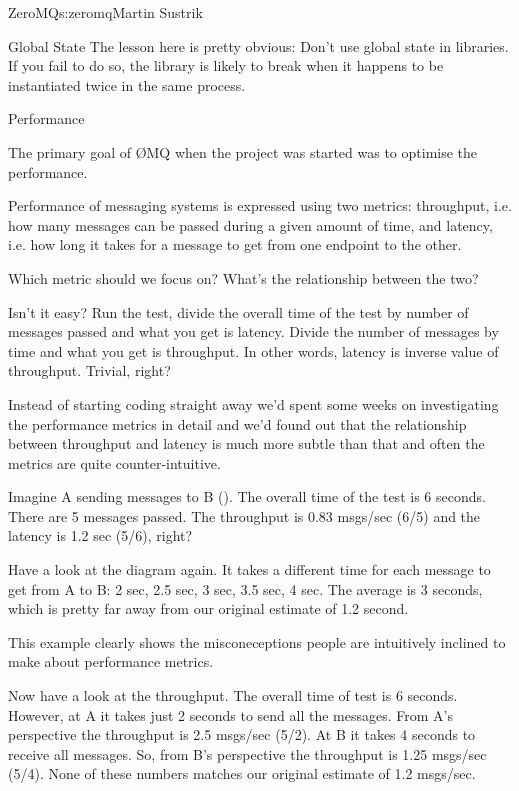 \begin{aosachapter}{ZeroMQ}{s:zeromq}{Martin Sustrik}
\begin{aosasect1}{Global State}
The lesson here is pretty obvious: Don't use global state in
libraries. If you fail to do so, the library is likely to break when
it happens to be instantiated twice in the same process.

\end{aosasect1}

\begin{aosasect1}{Performance}

The primary goal of ØMQ when the project was started was to optimise
the performance.

Performance of messaging systems is expressed using two metrics:
throughput, i.e. how many messages can be passed during a given amount
of time, and latency, i.e. how long it takes for a message to get from
one endpoint to the other.

Which metric should we focus on? What's the relationship between the
two?

Isn't it easy? Run the test, divide the overall time of the test by
number of messages passed and what you get is latency. Divide the
number of messages by time and what you get is throughput. In other
words, latency is inverse value of throughput. Trivial, right?

Instead of starting coding straight away we'd spent some weeks on
investigating the performance metrics in detail and we'd found out
that the relationship between throughput and latency is much more
subtle than that and often the metrics are quite counter-intuitive.


Imagine A sending messages to B ().  The
overall time of the test is 6 seconds. There are 5 messages
passed. The throughput is 0.83 msgs/sec (6/5) and the latency is 1.2
sec (5/6), right?

Have a look at the diagram again. It takes a different time for each
message to get from A to B: 2 sec, 2.5 sec, 3 sec, 3.5 sec, 4 sec. The
average is 3 seconds, which is pretty far away from our original
estimate of 1.2 second.

This example clearly shows the misconeceptions people are intuitively
inclined to make about performance metrics.

Now have a look at the throughput. The overall time of test is 6
seconds. However, at A it takes just 2 seconds to send all the
messages. From A's perspective the throughput is 2.5 msgs/sec
(5/2). At B it takes 4 seconds to receive all messages. So, from B's
perspective the throughput is 1.25 msgs/sec (5/4). None of these
numbers matches our original estimate of 1.2 msgs/sec.


\end{aosasect1}
\end{aosachapter}
